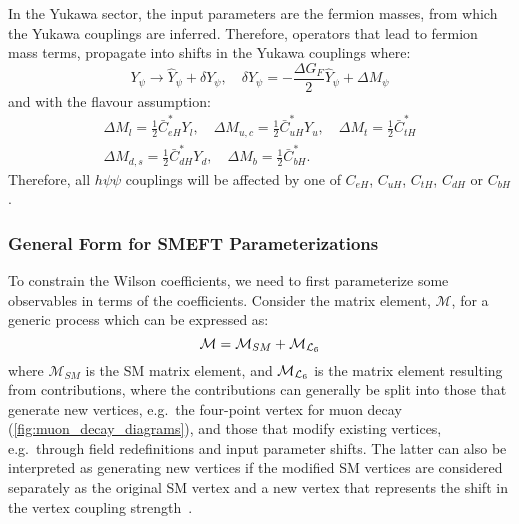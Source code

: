 In the Yukawa sector, the input parameters are the fermion masses, from which the Yukawa couplings are inferred. Therefore, operators that lead to fermion mass terms, propagate into shifts in the Yukawa couplings where:
\begin{equation}
  Y_\psi \to \hat{Y}_\psi + \delta Y_\psi, \quad \delta Y_\psi = - \frac{\Delta G_F}{2} \hat{Y}_\psi + \Delta M_\psi
\end{equation}
and with the \topUtl flavour assumption:
\begin{gather}
  \Delta M_l = \frac{1}{2} \bar{C}_{eH}^* Y_l, \quad \Delta M_{u,c} = \frac{1}{2} \bar{C}_{uH}^* Y_u, \quad \Delta M_t = \frac{1}{2} \bar{C}_{tH}^* \\
  \Delta M_{d,s} = \frac{1}{2} \bar{C}_{dH}^* Y_d, \quad \Delta M_b = \frac{1}{2} \bar{C}_{bH}^* .
\end{gather}
Therefore, all $h\psi\psi$ couplings will be affected by one of $C_{eH}$, $C_{uH}$, $C_{tH}$, $C_{dH}$ or $C_{bH}$.

\subsubsection{General Form for SMEFT Parameterizations}\label{sec:smeft_general_form}
To constrain the Wilson coefficients, we need to first parameterize some observables in terms of the coefficients. Consider the matrix element, $\mathcal{M}$, for a generic process which can be expressed as:
\begin{equation}
  \mathcal{M} = \mathcal{M}_{SM} + \mathcal{M}_{\mathcal{L}_6}
\end{equation}
where $\mathcal{M}_{SM}$ is the SM matrix element, and $\mathcal{M}_{\mathcal{L}_6}$ is the matrix element resulting from \Lsix contributions, where the contributions can generally be split into those that generate new vertices, e.g.\ the four-point vertex for muon decay (\cref{fig:muon_decay_diagrams}), and those that modify existing vertices, e.g.\ through field redefinitions and input parameter shifts. The latter can also be interpreted as generating new vertices if the modified SM vertices are considered separately as the original SM vertex and a new vertex that represents the shift in the vertex coupling strength~\cite{Brivio:2020onw}.

